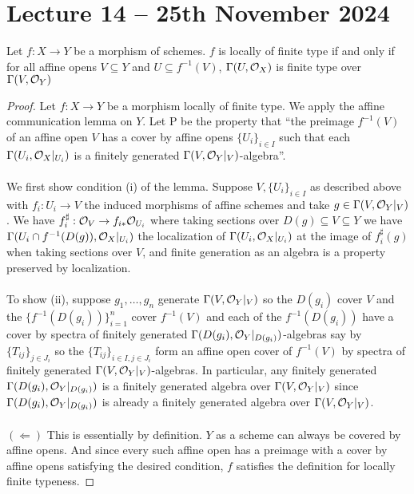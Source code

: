 \section{Lecture 14 -- 25th November 2024}\label{sec: lecture 14}
\begin{proposition}\label{prop: affine communication for locally finite type}
    Let $f:X\to Y$ be a morphism of schemes. $f$ is locally of finite type if and only if for all affine opens $V\subseteq Y$ and $U\subseteq f^{-1}(V)$, $\Gamma(U,\mathcal{O}_{X})$ is finite type over $\Gamma(V,\mathcal{O}_{Y})$
\end{proposition}
\begin{proof}
    Let $f:X\to Y$ be a morphism locally of finite type. We apply the affine communication lemma  on $Y$. Let P be the property that ``the preimage $f^{-1}(V)$ of an affine open $V$ has a cover by affine opens $\{U_{i}\}_{i\in I}$ such that each $\Gamma(U_{i},\mathcal{O}_{X}|_{U_{i}})$ is a finitely generated $\Gamma(V,\mathcal{O}_{Y}|_{V})$-algebra''.
    \\\\
    We first show condition (i) of the lemma. Suppose $V,\{U_{i}\}_{i\in I}$ as described above with $f_{i}:U_{i}\to V$ the induced morphisms of affine schemes and take $g\in\Gamma(V,\mathcal{O}_{Y}|_{V})$. We have $f_{i}^{\sharp}:\mathcal{O}_{V}\to f_{i*}\mathcal{O}_{U_{i}}$ where taking sections over $D(g)\subseteq V\subseteq Y$ we have $\Gamma(U_{i}\cap f^{-1}(D(g)),\mathcal{O}_{X}|_{U_{i}})$ the localization of $\Gamma(U_{i},\mathcal{O}_{X}|_{U_{i}})$ at the image of $f_{i}^{\sharp}(g)$ when taking sections over $V$, and finite generation as an algebra is a property preserved by localization. 
    \\\\
    To show (ii), suppose $g_{1},\dots,g_{n}$ generate $\Gamma(V,\mathcal{O}_{Y}|_{V})$ so the $D(g_{i})$ cover $V$ and the $\{f^{-1}(D(g_{i}))\}_{i=1}^{n}$ cover $f^{-1}(V)$ and each of the $f^{-1}(D(g_{i}))$ have a cover by spectra of finitely generated $\Gamma(D(g_{i}),\mathcal{O}_{Y}|_{D(g_{i})})$-algebras say by $\{T_{ij}\}_{j\in J_{i}}$ so the $\{T_{ij}\}_{i\in I, j\in J_{i}}$ form an affine open cover of $f^{-1}(V)$ by spectra of finitely generated $\Gamma(V,\mathcal{O}_{Y}|_{V})$-algebras. In particular, any finitely generated $\Gamma(D(g_{i}),\mathcal{O}_{Y}|_{D(g_{i})})$ is a finitely generated algebra over $\Gamma(V,\mathcal{O}_{Y}|_{V})$ since $\Gamma(D(g_{i}),\mathcal{O}_{Y}|_{D(g_{i})})$ is already a finitely generated algebra over $\Gamma(V,\mathcal{O}_{Y}|_{V})$.
    \\\\
    $(\Longleftarrow)$ This is essentially by definition. $Y$ as a scheme can always be covered by affine opens. And since every such affine open has a preimage with a cover by affine opens satisfying the desired condition, $f$ satisfies the definition for locally finite typeness. 
\end{proof}